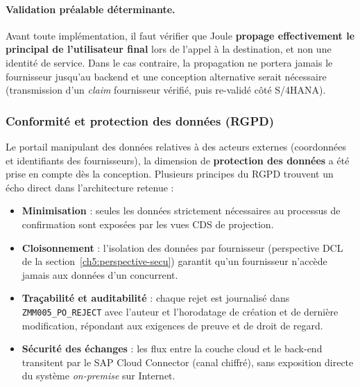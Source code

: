 \documentclass[12pt,a4paper,oneside]{report}
\begin{document}
\paragraph{Validation préalable déterminante.} Avant toute implémentation, il faut
vérifier que Joule \textbf{propage effectivement le principal de l'utilisateur final} lors
de l'appel à la destination, et non une identité de service. Dans le cas contraire, la
propagation ne portera jamais le fournisseur jusqu'au backend et une conception
alternative serait nécessaire (transmission d'un \textit{claim} fournisseur vérifié, puis
re-validé côté S/4HANA).

\subsubsection{Conformité et protection des données (RGPD)}\label{ch5:rgpd}

Le portail manipulant des données relatives à des acteurs externes (coordonnées et
identifiants des fournisseurs), la dimension de \textbf{protection des données} a été prise
en compte dès la conception. Plusieurs principes du RGPD trouvent un écho direct dans
l'architecture retenue :

\begin{itemize}[label=---, itemsep=0.2em]
    \item \textbf{Minimisation} : seules les données strictement nécessaires au processus
    de confirmation sont exposées par les vues CDS de projection.
    \item \textbf{Cloisonnement} : l'isolation des données par fournisseur (perspective
    DCL de la section~\ref{ch5:perspective-secu}) garantit qu'un fournisseur n'accède
    jamais aux données d'un concurrent.
    \item \textbf{Traçabilité et auditabilité} : chaque rejet est journalisé dans
    \texttt{ZMM005\_PO\_REJECT} avec l'auteur et l'horodatage de création et de dernière
    modification, répondant aux exigences de preuve et de droit de regard.
    \item \textbf{Sécurité des échanges} : les flux entre la couche cloud et le back-end
    transitent par le SAP Cloud Connector (canal chiffré), sans exposition directe du
    système \textit{on-premise} sur Internet.
\end{itemize}
\end{document}
